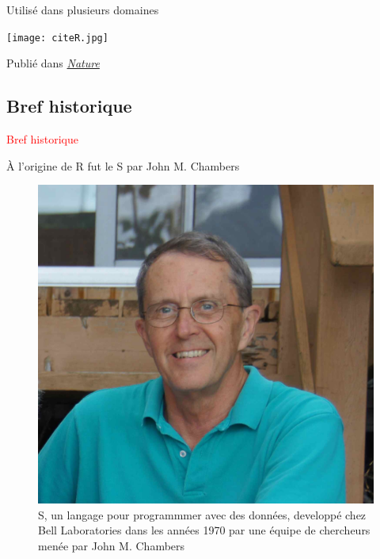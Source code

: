\documentclass[11pt]{beamer}\usepackage[]{graphicx}\usepackage[]{color}
\begin{document}
\begin{frame}{Utilis\'{e} dans plusieurs domaines}

\begin{center}
\texttt{[image: citeR.jpg]}
\end{center}

\vspace{0.05in}

Publi\'{e} dans \href{http://www.nature.com/news/programming-tools-adventures-with-r-1.16609}{\textit{Nature}}
\end{frame}



\subsection{Bref historique}

\begin{frame}
 \begin{center}
  \Huge{\textcolor{red}{Bref historique}}
 \end{center}
\end{frame}


\begin{frame}{\`{A} l'origine de R fut le S par John M. Chambers}
\begin{center}
\begin{figure}
\includegraphics[scale=0.10]{john.jpg}
\caption{S, un langage pour programmmer avec des donn\'{e}es, developp\'{e} chez Bell Laboratories dans les ann\'{e}es 1970 par une \'{e}quipe de chercheurs men\'{e}e par John M. Chambers}
\end{figure}
\end{center}
\end{frame}
\end{document}
